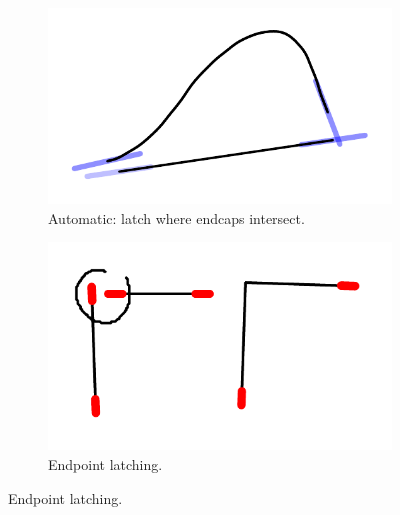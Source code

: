 \begin{figure}
  \centering
  \begin{subfigure}[t]{0.45\textwidth}
    \centering
    \includegraphics[width=0.6\linewidth]{img/latch-auto-endcaps.pdf}
    \caption{Automatic: latch where endcaps intersect.}
    \label{fig:latch-auto}
  \end{subfigure}
  \hspace{5mm}
  \begin{subfigure}[t]{0.45\textwidth}
    \centering
    \includegraphics[width=0.6\linewidth]{img/latch-manual-endpoint.pdf}
    \caption{Endpoint latching.}
    \label{fig:latch-endpoint}
  \end{subfigure}


\end{figure}
